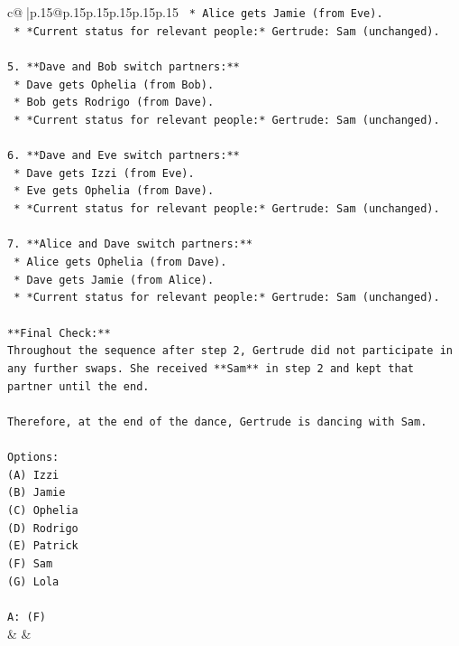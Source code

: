 \documentclass{article}
\begin{document}
{\begin{supertabular}{c@{$\;$}|p{.15\linewidth}@{}p{.15\linewidth}p{.15\linewidth}p{.15\linewidth}p{.15\linewidth}p{.15\linewidth}}
{{{\texttt{    *   Alice gets Jamie (from Eve).} \\
\texttt{    *   *Current status for relevant people:* Gertrude: Sam (unchanged).} \\
\\ 
\texttt{5.  **Dave and Bob switch partners:**} \\
\texttt{    *   Dave gets Ophelia (from Bob).} \\
\texttt{    *   Bob gets Rodrigo (from Dave).} \\
\texttt{    *   *Current status for relevant people:* Gertrude: Sam (unchanged).} \\
\\ 
\texttt{6.  **Dave and Eve switch partners:**} \\
\texttt{    *   Dave gets Izzi (from Eve).} \\
\texttt{    *   Eve gets Ophelia (from Dave).} \\
\texttt{    *   *Current status for relevant people:* Gertrude: Sam (unchanged).} \\
\\ 
\texttt{7.  **Alice and Dave switch partners:**} \\
\texttt{    *   Alice gets Ophelia (from Dave).} \\
\texttt{    *   Dave gets Jamie (from Alice).} \\
\texttt{    *   *Current status for relevant people:* Gertrude: Sam (unchanged).} \\
\\ 
\texttt{**Final Check:**} \\
\texttt{Throughout the sequence after step 2, Gertrude did not participate in any further swaps. She received **Sam** in step 2 and kept that partner until the end.} \\
\\ 
\texttt{Therefore, at the end of the dance, Gertrude is dancing with Sam.} \\
\\ 
\texttt{Options:} \\
\texttt{(A) Izzi} \\
\texttt{(B) Jamie} \\
\texttt{(C) Ophelia} \\
\texttt{(D) Rodrigo} \\
\texttt{(E) Patrick} \\
\texttt{(F) Sam} \\
\texttt{(G) Lola} \\
\\ 
\texttt{A: (F)} \\
            }
        }
    }
    & & \\ \\


\end{supertabular}}
\end{document}
